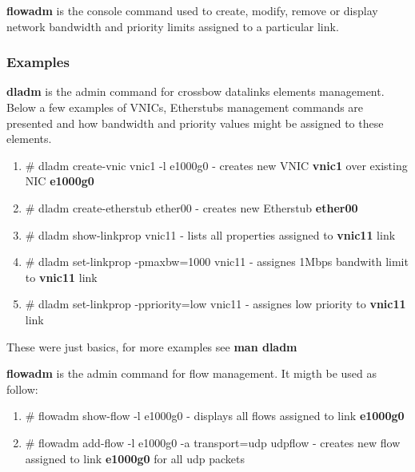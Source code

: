 \documentclass[11pt]{book}
\begin{document}
                        \textbf{flowadm} is the console command used to create, modify, remove or display network bandwidth and priority limits assigned to a particular link. 


                \subsubsection{Examples}

                        \textbf{dladm} is the admin command for crossbow datalinks elements management. Below a few examples of VNICs, Etherstubs management commands are presented and how
                        bandwidth and priority values might be assigned to these elements.

                        \begin{enumerate}
                        	\item{\# dladm create-vnic vnic1 -l e1000g0 - creates new VNIC \textbf{vnic1} over existing NIC \textbf{e1000g0}}
        	                \item{\# dladm create-etherstub ether00 - creates new Etherstub \textbf{ether00}}
                        	\item{\# dladm show-linkprop vnic11 - lists all properties assigned to \textbf{vnic11} link}
                        	\item{\# dladm set-linkprop -pmaxbw=1000 vnic11 - assignes 1Mbps bandwith limit to \textbf{vnic11} link}
                        	\item{\# dladm set-linkprop -ppriority=low vnic11 - assignes low priority to \textbf{vnic11} link}
                        \end{enumerate}

                        These were just basics, for more examples see \textbf{man dladm}

                        \medskip
        
                        \textbf{flowadm} is the admin command for flow management. It migth be used as follow:     

                        \begin{enumerate}
                                \item{\# flowadm show-flow -l e1000g0 - displays all flows assigned to link \textbf{e1000g0}}
                                \item{\# flowadm add-flow -l e1000g0 -a transport=udp udpflow - creates new flow assigned to link \textbf{e1000g0} for all udp packets}
                        \end{enumerate}
\end{document}
